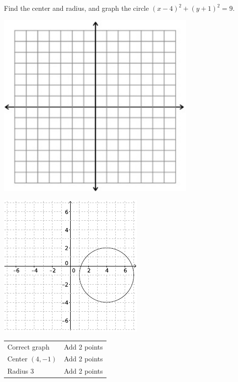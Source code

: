 {
	Find the center and radius, and graph the circle $(x-4)^2+(y+1)^2=9$.\begin{onlyproblem}\begin{center}\includegraphics{fig-graphpaper.png}\end{center}\end{onlyproblem} \begin{onlysolution}\begin{center}\includegraphics{fig100-20-b-answer}\end{center}\end{onlysolution}
}
{
	\begin{tabular}{l l}
	Correct graph & Add 2 points\\
	Center $(4, -1)$ & Add 2 points\\
	Radius $3$ & Add 2 points
	\end{tabular}
}

